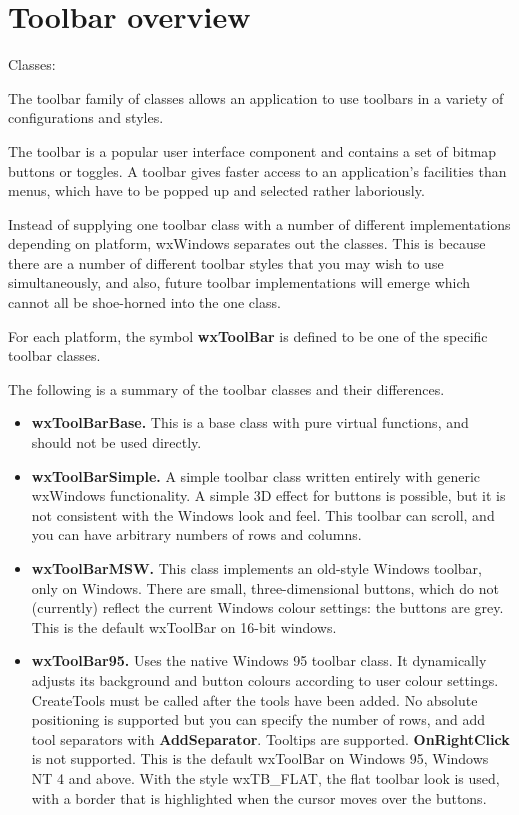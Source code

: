 \section{Toolbar overview}\label{wxtoolbaroverview}

Classes: 

The toolbar family of classes allows an application to use toolbars
in a variety of configurations and styles.

The toolbar is a popular user interface component and contains a set of bitmap
buttons or toggles. A toolbar gives faster access to an application's facilities than
menus, which have to be popped up and selected rather laboriously.

Instead of supplying one toolbar class with a number
of different implementations depending on platform, wxWindows separates
out the classes. This is because there are a number of different toolbar
styles that you may wish to use simultaneously, and also, future
toolbar implementations will emerge which
cannot all be shoe-horned into the one class.

For each platform, the symbol {\bf wxToolBar} is defined to be one of the
specific toolbar classes.

The following is a summary of the toolbar classes and their differences.

\begin{itemize}\itemsep=0pt
\item {\bf wxToolBarBase.} This is a base class with pure virtual functions,
and should not be used directly.
\item {\bf wxToolBarSimple.} A simple toolbar class written entirely with generic wxWindows
functionality. A simple 3D effect for buttons is possible, but it is not consistent
with the Windows look and feel. This toolbar can scroll, and you can have arbitrary
numbers of rows and columns.
\item {\bf wxToolBarMSW.} This class implements an old-style Windows toolbar, only on
Windows. There are small, three-dimensional buttons, which do not (currently) reflect
the current Windows colour settings: the buttons are grey. This is the default wxToolBar
on 16-bit windows.
\item {\bf wxToolBar95.} Uses the native Windows 95 toolbar class. It dynamically adjusts its
background and button colours according to user colour settings.
CreateTools must be called after the tools have been added.
No absolute positioning is supported but you can specify the number
of rows, and add tool separators with {\bf AddSeparator}.
Tooltips are supported. {\bf OnRightClick} is not supported. This is the default wxToolBar
on Windows 95, Windows NT 4 and above. With the style wxTB\_FLAT, the flat toolbar
look is used, with a border that is highlighted when the cursor moves over the buttons.
\end{itemize}

